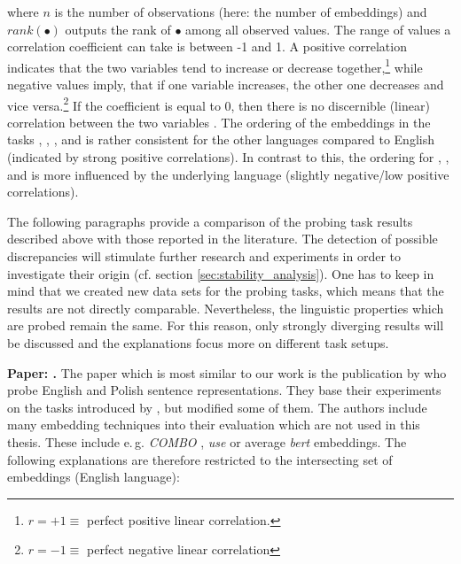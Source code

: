 where $n$ is the number of observations (here: the number of embeddings) and $rank(\bullet)$ outputs the rank of $\bullet$ among all observed values. The range of values a correlation coefficient can take is between -1 and 1. A positive correlation indicates that the two variables tend to increase or decrease together,\footnote{$r = +1 \equiv$ perfect positive linear correlation.} while negative values imply, that if one variable increases, the other one decreases and vice versa.\footnote{$r = -1 \equiv$ perfect negative linear correlation} If the coefficient is equal to 0, then there is no discernible (linear) correlation between the two variables \citep[pp. 135--148]{Fahrmeir.2011}.
The ordering of the embeddings in the tasks , , ,  and  is rather consistent for the other languages compared to English (indicated by strong positive correlations). In contrast to this, the ordering for , ,  and  is more influenced by the underlying language (slightly negative/low positive correlations).

 The following paragraphs provide a comparison of the probing task results described above with those reported in the literature. The detection of possible discrepancies will stimulate further research and experiments in order to investigate their origin (cf. section \vref{sec:stability_analysis}). One has to keep in mind that we created new data sets for the probing tasks, which means that the results are not directly comparable. Nevertheless, the linguistic properties which are probed remain the same. For this reason, only strongly diverging results will be discussed and the explanations focus more on different task setups.

 \textbf{Paper: .} The paper which is most similar to our work is the publication by \citep{Krasnowska.2019} who probe English and Polish sentence representations. They base their experiments on the tasks introduced by \citep{Conneau.2018a}, but modified some of them. The authors include many embedding techniques into their evaluation which are not used in this thesis. These include e.\,g. \textit{COMBO} \citep{Rybak.2018}, \textit{\gls{use}} \citep{Cer.2018} or average \textit{\gls{bert}} embeddings. The following explanations are therefore restricted to the intersecting set of embeddings (English language):

